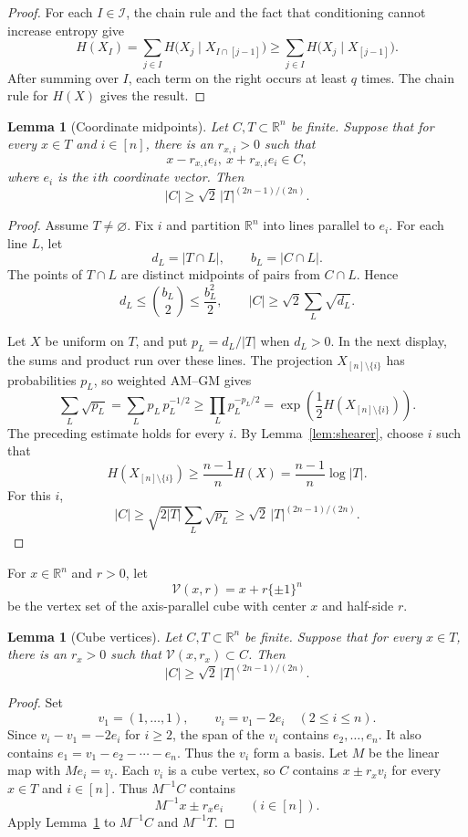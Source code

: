 \documentclass[11pt]{amsart}
\numberwithin{equation}{section}
\theoremstyle{plain}
\newtheorem{lemma}[theorem]{Lemma}
\theoremstyle{definition}
\newcommand{\R}{\mathbb{R}}
\begin{document}
\begin{proof}
For each $I\in\mathcal I$, the chain rule and the fact that conditioning cannot increase
entropy give
\[
 H(X_I)
 =\sum_{j\in I}H\bigl(X_j\mid X_{I\cap[j-1]}\bigr)
 \geq\sum_{j\in I}H\bigl(X_j\mid X_{[j-1]}\bigr).
\]
After summing over $I$, each term on the right occurs at least $q$ times.
The chain rule for $H(X)$ gives the result.
\end{proof}

\begin{lemma}[Coordinate midpoints]\label{lem:axial}
Let $C,T\subset\R^n$ be finite.  Suppose that for every $x\in T$ and $i\in[n]$,
there is an $r_{x,i}>0$ such that
\[
 x-r_{x,i}e_i,\ x+r_{x,i}e_i\in C,
\]
where $e_i$ is the $i$th coordinate vector.  Then
\[
 |C|\geq\sqrt2\,|T|^{(2n-1)/(2n)}.
\]
\end{lemma}

\begin{proof}
Assume $T\neq\varnothing$.  Fix $i$ and partition $\R^n$ into lines parallel
to $e_i$.  For each line $L$, let
\[
 d_L=|T\cap L|,
 \qquad
 b_L=|C\cap L|.
\]
The points of $T\cap L$ are distinct midpoints of pairs from $C\cap L$.
Hence
\[
 d_L\leq\binom{b_L}{2}\leq\frac{b_L^2}{2},
 \qquad
 |C|\geq\sqrt2\sum_L\sqrt{d_L}.
\]

Let $X$ be uniform on $T$, and put $p_L=d_L/|T|$ when $d_L>0$.  In the
next display, the sums and product run over these lines.  The projection
$X_{[n]\setminus\{i\}}$ has probabilities $p_L$, so weighted AM--GM gives
\[
 \sum_L\sqrt{p_L}
 =\sum_L p_L\,p_L^{-1/2}
 \geq\prod_L p_L^{-p_L/2}
 =\exp\left(\frac12H(X_{[n]\setminus\{i\}})\right).
\]
The preceding estimate holds for every $i$.  By Lemma~\ref{lem:shearer},
choose $i$ such that
\[
 H(X_{[n]\setminus\{i\}})
 \geq\frac{n-1}{n}H(X)
 =\frac{n-1}{n}\log|T|.
\]
For this $i$,
\[
 |C|
 \geq\sqrt{2|T|}\sum_L\sqrt{p_L}
 \geq\sqrt2\,|T|^{(2n-1)/(2n)}.
\]
\end{proof}

For $x\in\R^n$ and $r>0$, let
\[
 \mathcal V(x,r)=x+r\{\pm1\}^n
\]
be the vertex set of the axis-parallel cube with center $x$ and half-side $r$.

\begin{lemma}[Cube vertices]\label{lem:vertices}
Let $C,T\subset\R^n$ be finite.  Suppose that for every $x\in T$, there is an
$r_x>0$ such that $\mathcal V(x,r_x)\subset C$.  Then
\[
 |C|\geq\sqrt2\,|T|^{(2n-1)/(2n)}.
\]
\end{lemma}

\begin{proof}
Set
\[
 v_1=(1,\ldots,1),
 \qquad
 v_i=v_1-2e_i\quad(2\leq i\leq n).
\]
Since $v_i-v_1=-2e_i$ for $i\geq2$, the span of the $v_i$ contains
$e_2,\ldots,e_n$.  It also contains
$e_1=v_1-e_2-\cdots-e_n$.  Thus the $v_i$ form a basis.  Let $M$ be the
linear map with $Me_i=v_i$.  Each $v_i$ is a cube vertex, so $C$ contains
$x\pm r_xv_i$ for every $x\in T$ and $i\in[n]$.
Thus $M^{-1}C$ contains
\[
 M^{-1}x\pm r_xe_i\qquad(i\in[n]).
\]
Apply Lemma~\ref{lem:axial} to $M^{-1}C$ and $M^{-1}T$.
\end{proof}
\end{document}
